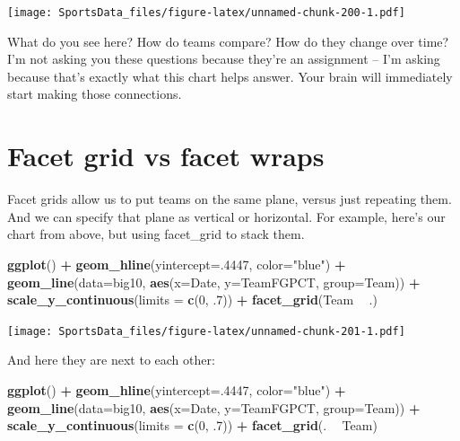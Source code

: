 \documentclass[
]{book}
\newenvironment{Shaded}{\begin{snugshade}}{\end{snugshade}}
\newcommand{\DataTypeTok}[1]{\textcolor[rgb]{0.13,0.29,0.53}{#1}}
\newcommand{\DecValTok}[1]{\textcolor[rgb]{0.00,0.00,0.81}{#1}}
\newcommand{\FloatTok}[1]{\textcolor[rgb]{0.00,0.00,0.81}{#1}}
\newcommand{\KeywordTok}[1]{\textcolor[rgb]{0.13,0.29,0.53}{\textbf{#1}}}
\newcommand{\NormalTok}[1]{#1}
\newcommand{\OperatorTok}[1]{\textcolor[rgb]{0.81,0.36,0.00}{\textbf{#1}}}
\newcommand{\StringTok}[1]{\textcolor[rgb]{0.31,0.60,0.02}{#1}}
\begin{document}
\texttt{[image: SportsData\_files/figure-latex/unnamed-chunk-200-1.pdf]}

What do you see here? How do teams compare? How do they change over time? I'm not asking you these questions because they're an assignment -- I'm asking because that's exactly what this chart helps answer. Your brain will immediately start making those connections.

\hypertarget{facet-grid-vs-facet-wraps}{%
\section{Facet grid vs facet wraps}\label{facet-grid-vs-facet-wraps}}

Facet grids allow us to put teams on the same plane, versus just repeating them. And we can specify that plane as vertical or horizontal. For example, here's our chart from above, but using facet\_grid to stack them.

\begin{Shaded}
\begin{Highlighting}[]
\KeywordTok{ggplot}\NormalTok{() }\OperatorTok{+}\StringTok{ }\KeywordTok{geom_hline}\NormalTok{(}\DataTypeTok{yintercept=}\NormalTok{.}\DecValTok{4447}\NormalTok{, }\DataTypeTok{color=}\StringTok{"blue"}\NormalTok{) }\OperatorTok{+}\StringTok{ }\KeywordTok{geom_line}\NormalTok{(}\DataTypeTok{data=}\NormalTok{big10, }\KeywordTok{aes}\NormalTok{(}\DataTypeTok{x=}\NormalTok{Date, }\DataTypeTok{y=}\NormalTok{TeamFGPCT, }\DataTypeTok{group=}\NormalTok{Team)) }\OperatorTok{+}\StringTok{ }\KeywordTok{scale_y_continuous}\NormalTok{(}\DataTypeTok{limits =} \KeywordTok{c}\NormalTok{(}\DecValTok{0}\NormalTok{, }\FloatTok{.7}\NormalTok{)) }\OperatorTok{+}\StringTok{ }\KeywordTok{facet_grid}\NormalTok{(Team }\OperatorTok{~}\StringTok{ }\NormalTok{.)}
\end{Highlighting}
\end{Shaded}

\texttt{[image: SportsData\_files/figure-latex/unnamed-chunk-201-1.pdf]}

And here they are next to each other:

\begin{Shaded}
\begin{Highlighting}[]
\KeywordTok{ggplot}\NormalTok{() }\OperatorTok{+}\StringTok{ }\KeywordTok{geom_hline}\NormalTok{(}\DataTypeTok{yintercept=}\NormalTok{.}\DecValTok{4447}\NormalTok{, }\DataTypeTok{color=}\StringTok{"blue"}\NormalTok{) }\OperatorTok{+}\StringTok{ }\KeywordTok{geom_line}\NormalTok{(}\DataTypeTok{data=}\NormalTok{big10, }\KeywordTok{aes}\NormalTok{(}\DataTypeTok{x=}\NormalTok{Date, }\DataTypeTok{y=}\NormalTok{TeamFGPCT, }\DataTypeTok{group=}\NormalTok{Team)) }\OperatorTok{+}\StringTok{ }\KeywordTok{scale_y_continuous}\NormalTok{(}\DataTypeTok{limits =} \KeywordTok{c}\NormalTok{(}\DecValTok{0}\NormalTok{, }\FloatTok{.7}\NormalTok{)) }\OperatorTok{+}\StringTok{ }\KeywordTok{facet_grid}\NormalTok{(. }\OperatorTok{~}\StringTok{ }\NormalTok{Team)}
\end{Highlighting}
\end{Shaded}
\end{document}
